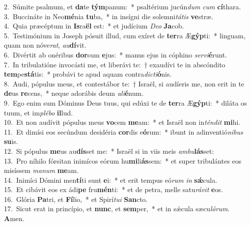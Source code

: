 {2.~}Súmite psalmum, et \textbf{da}te \textbf{tým}panum:~* psaltérium jucún\textit{dum} \textit{cum} \textbf{cí}thara.\\
{3.~}Buccináte in Neo\textbf{mé}nia \textbf{tu}ba,~* in insígni die solemni\textit{tá}\textit{tis} \textbf{ve}stræ.\\
{4.~}Quia præcéptum in \textbf{Is}ra\textbf{ël} est:~* et judícium \textit{De}\textit{o} \textbf{Ja}cob.\\
{5.~}Testimónium in Joseph pósuit illud, cum exíret de \textbf{ter}ra Æ\textbf{gýp}ti:~* linguam, quam non nóve\textit{rat}, \textit{au}\textbf{dí}vit.\\
{6.~}Divértit ab onéribus \textbf{dor}sum \textbf{e}jus:~* manus ejus in cóphino \textit{ser}\textit{vi}\textbf{é}runt.\\
{7.~}In tribulatióne invocásti me, et liberávi te:~† exaudívi te in abscóndito \textbf{tem}pe\textbf{stá}tis:~* probávi te apud aquam contra\textit{di}\textit{cti}\textbf{ó}nis.\\
{8.~}Audi, pópulus meus, et contestábor te:~† Israël, si audíeris me, non erit in te \textbf{de}us \textbf{re}cens,~* neque adorábis deum \textit{a}\textit{li}\textbf{é}num.\\
{9.~}Ego enim sum Dóminus Deus tuus, qui edúxi te de \textbf{ter}ra Æ\textbf{gýp}ti:~* diláta os tuum, et im\textit{plé}\textit{bo} \textbf{il}lud.\\
{10.~}Et non audívit pópulus meus \textbf{vo}cem \textbf{me}am:~* et Israël non in\textit{tén}\textit{dit} \textbf{mi}hi.\\
{11.~}Et dimísi eos secúndum desidéria \textbf{cor}dis e\textbf{ó}rum:~* ibunt in adinventió\textit{ni}\textit{bus} \textbf{su}is.\\
{12.~}Si pópulus \textbf{me}us au\textbf{dís}set me:~* Israël si in viis meis \textit{am}\textit{bu}\textbf{lás}set:\\
{13.~}Pro níhilo fórsitan inimícos eórum hu\textbf{mi}li\textbf{ás}sem:~* et super tribulántes eos misíssem \textit{ma}\textit{num} \textbf{me}am.\\
{14.~}Inimíci Dómini men\textbf{tí}ti sunt \textbf{e}i:~* et erit tempus eó\textit{rum} \textit{in} \textbf{sǽ}cula.\\
{15.~}Et cibávit eos ex ádi\textbf{pe} fru\textbf{mén}ti:~* et de petra, melle satu\textit{rá}\textit{vit} \textbf{e}os.\\
{16.~}Glória \textbf{Pa}tri, et \textbf{Fí}lio,~* et Spirí\textit{tu}\textit{i} \textbf{San}cto.\\
{17.~}Sicut erat in princípio, et \textbf{nunc}, et \textbf{sem}per,~* et in sǽcula sæcu\textit{ló}\textit{rum}. \textbf{A}men.\\
